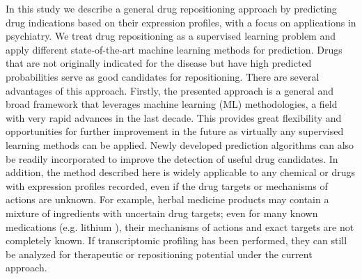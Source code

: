     In this study we describe a general drug repositioning approach by predicting drug indications based on their expression profiles, with a focus on applications in psychiatry. We treat drug repositioning as a supervised learning problem and apply different state-of-the-art machine learning methods for prediction. Drugs that are not originally indicated for the disease but have high predicted probabilities serve as good candidates for repositioning. There are several advantages of this approach. Firstly, the presented approach is a general and broad framework that leverages machine learning (ML) methodologies, a field with very rapid advances in the last decade. This provides great flexibility and opportunities for further improvement in the future as virtually any supervised learning methods can be applied. Newly developed prediction algorithms can also be readily incorporated to improve the detection of useful drug candidates. In addition, the method described here is widely applicable to any chemical or drugs with expression profiles recorded, even if the drug targets or mechanisms of actions are unknown. For example, herbal medicine products may contain a mixture of ingredients with uncertain drug targets; even for many known medications (e.g. lithium \cite{malhi2013potential}), their mechanisms of actions and exact targets are not completely known. If transcriptomic profiling has been performed, they can still be analyzed for therapeutic or repositioning potential under the current approach.

